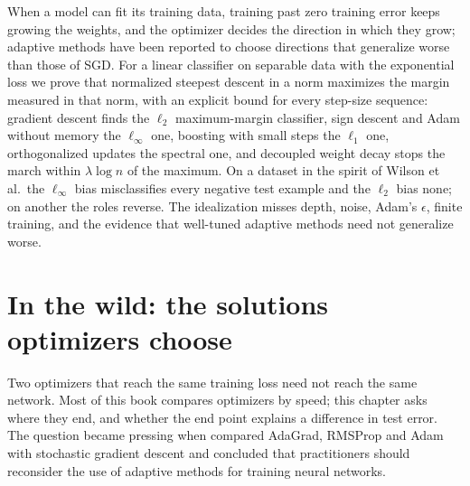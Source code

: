 \newcommand{\biasP}{\mathcal{P}_n}
\newcommand{\biasqmin}{q_{\min}}
\newcommand{\biasbar}{\bar\gamma}
\newcommand{\biasU}{\mathcal{U}^\star}
\newcommand{\biasartanh}{\operatorname{artanh}}

\begin{refsection}

\begin{chaptersummary}
When a model can fit its training data, training past zero training error keeps growing the weights, and the optimizer decides the direction in which they grow; adaptive methods have been reported to choose directions that generalize worse than those of SGD. For a linear classifier on separable data with the exponential loss we prove that normalized steepest descent in a norm maximizes the margin measured in that norm, with an explicit bound for every step-size sequence: gradient descent finds the $\ell_2$ maximum-margin classifier, sign descent and Adam without memory the $\ell_\infty$ one, boosting with small steps the $\ell_1$ one, orthogonalized updates the spectral one, and decoupled weight decay stops the march within $\lambda\log n$ of the maximum. On a dataset in the spirit of Wilson et al.\ the $\ell_\infty$ bias misclassifies every negative test example and the $\ell_2$ bias none; on another the roles reverse. The idealization misses depth, noise, Adam's $\epsilon$, finite training, and the evidence that well-tuned adaptive methods need not generalize worse.
\end{chaptersummary}

\section{In the wild: the solutions optimizers choose}\label{sec:bias:wild}

Two optimizers that reach the same training loss need not reach the same network. Most of this book compares optimizers by speed; this chapter asks where they end, and whether the end point explains a difference in test error. The question became pressing when \textcite{WilsonEtAl2017} compared AdaGrad, RMSProp and Adam with stochastic gradient descent and concluded that practitioners should reconsider the use of adaptive methods for training neural networks.


\end{refsection}
